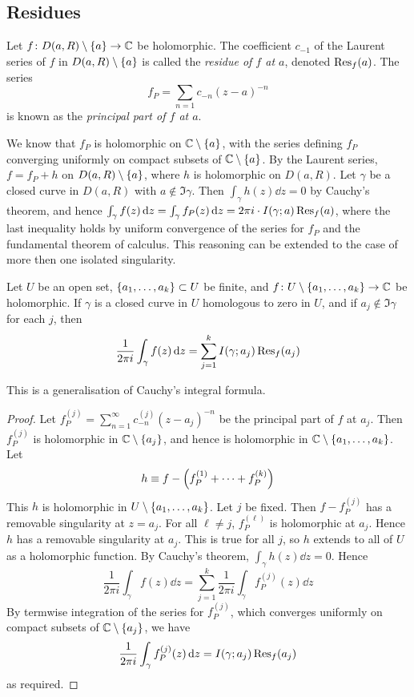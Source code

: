 \subsection{Residues}
\begin{definition}
	Let \( f \colon D(a,R) \setminus \qty{a} \to \mathbb C \) be holomorphic.
	The coefficient \( c_{-1} \) of the Laurent series of \( f \) in \( D(a,R) \setminus \qty{a} \) is called the \textit{residue of \( f \) at \( a \)}, denoted \( \Res_f(a) \).
	The series
	\[ f_P = \sum_{n=1} c_{-n} (z-a)^{-n} \]
	is known as the \textit{principal part of \( f \) at \( a \)}.
\end{definition}
We know that \( f_P \) is holomorphic on \( \mathbb C \setminus \qty{a} \), with the series defining \( f_P \) converging uniformly on compact subsets of \( \mathbb C \setminus \qty{a} \).
By the Laurent series, \( f = f_P + h \) on \( D(a,R) \setminus \qty{a} \), where \( h \) is holomorphic on \( D(a,R) \).
Let \( \gamma \) be a closed curve in \( D(a,R) \) with \( a \not\in \Im \gamma \).
Then \( \int_\gamma h(z) \dd{z} = 0 \) by Cauchy's theorem, and hence \( \int_\gamma f(z) \dd{z} = \int_\gamma f_P(z) \dd{z} = 2\pi i \cdot I(\gamma;a) \Res_f(a) \), where the last inequality holds by uniform convergence of the series for \( f_P \) and the fundamental theorem of calculus.
This reasoning can be extended to the case of more then one isolated singularity.
\begin{theorem}
	Let \( U \) be an open set, \( \qty{a_1, \dots, a_k} \subset U \) be finite, and \( f \colon U \setminus \qty{a_1, \dots, a_k} \to \mathbb C \) be holomorphic.
	If \( \gamma \) is a closed curve in \( U \) homologous to zero in \( U \), and if \( a_j \not\in \Im \gamma \) for each \( j \), then
	\[ \frac{1}{2\pi i} \int_\gamma f(z) \dd{z} = \sum_{j=1}^k I(\gamma;a_j) \Res_f(a_j) \]
\end{theorem}
This is a generalisation of Cauchy's integral formula.
\begin{proof}
	Let \( f_P^{(j)} = \sum_{n=1}^\infty c_{-n}^{(j)} (z-a_j)^{-n} \) be the principal part of \( f \) at \( a_j \).
	Then \( f_P^{(j)} \) is holomorphic in \( \mathbb C \setminus \qty{a_j} \), and hence is holomorphic in \( \mathbb C \setminus \qty{a_1, \dots, a_k} \).
	Let
	\[ h \equiv f - \qty(f_P^{(1)} + \dots + f_P^{(k)}) \]
	This \( h \) is holomorphic in \( U \setminus \qty{a_1, \dots, a_k} \).
	Let \( j \) be fixed.
	Then \( f - f_P^{(j)} \) has a removable singularity at \( z = a_j \).
	For all \( \ell \neq j \), \( f_P^{(\ell)} \) is holomorphic at \( a_j \).
	Hence \( h \) has a removable singularity at \( a_j \).
	This is true for all \( j \), so \( h \) extends to all of \( U \) as a holomorphic function.
	By Cauchy's theorem, \( \int_\gamma h(z) \dd{z} = 0 \).
	Hence
	\[ \frac{1}{2\pi i} \int_\gamma f(z) \dd{z} = \sum_{j=1}^k \frac{1}{2\pi i} \int_\gamma f_P^{(j)}(z) \dd{z} \]
	By termwise integration of the series for \( f_P^{(j)} \), which converges uniformly on compact subsets of \( \mathbb C \setminus \qty{a_j} \), we have
	\[ \frac{1}{2\pi i} \int_\gamma f_P^{(j)}(z) \dd{z} = I(\gamma;a_j) \Res_f(a_j) \]
	as required.
\end{proof}
